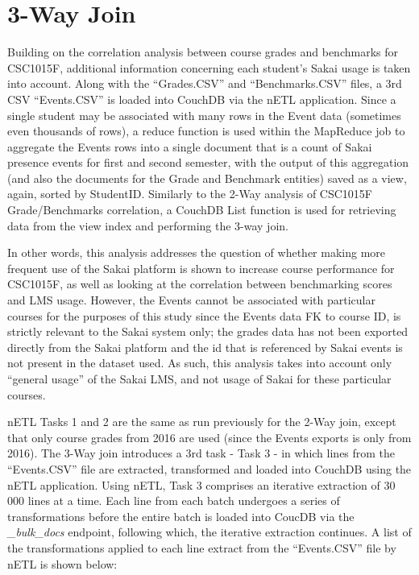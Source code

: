 \section{3-Way Join}
Building on the correlation analysis between course grades and benchmarks for CSC1015F, additional information concerning each student's Sakai usage is taken into account. Along with the ``Grades.CSV'' and ``Benchmarks.CSV'' files, a 3rd CSV ``Events.CSV'' is loaded into CouchDB via the nETL application. Since a single student may be associated with many rows in the Event data (sometimes even thousands of rows), a reduce function is used within the MapReduce job to aggregate the Events rows into a single document that is a count of Sakai presence events for first and second semester, with the output of this aggregation (and also the documents for the Grade and Benchmark entities) saved as a view, again, sorted by StudentID. Similarly to the 2-Way analysis of CSC1015F Grade/Benchmarks correlation, a CouchDB List function is used for retrieving data from the view index and performing the 3-way join.

In other words, this analysis addresses the question of whether making more frequent use of the Sakai platform is shown to increase course performance for CSC1015F, as well as looking at the correlation between benchmarking scores and LMS usage. However, the Events cannot be associated with particular courses for the purposes of this study since the Events data FK to course ID, is strictly relevant to the Sakai system only; the grades data has not been exported directly from the Sakai platform and the id that is referenced by Sakai events is not present in the dataset used. As such, this analysis takes into account only ``general usage'' of the Sakai LMS, and not usage of Sakai for these particular courses.

nETL Tasks 1 and 2 are the same as run previously for the 2-Way join, except that only course grades from 2016 are used (since the Events exports is only from 2016). The 3-Way join introduces a 3rd task - Task 3 - in which lines from the ``Events.CSV'' file are extracted, transformed and loaded into CouchDB using the nETL application. Using nETL, Task 3 comprises an iterative extraction of 30 000 lines at a time. Each line from each batch undergoes a series of transformations before the entire batch is loaded into CoucDB via the \textit{\_bulk\_docs} endpoint, following which, the iterative extraction continues. A list of the transformations applied to each line extract from the ``Events.CSV'' file by nETL is shown below:

